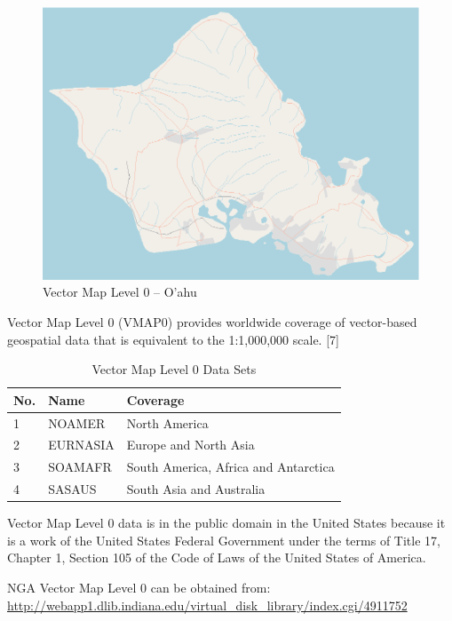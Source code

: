 \begin{figure}[h!]
  \centering
  \includegraphics[width=120mm]{eps/vmap0_oahu.eps}
  \caption{Vector Map Level 0 -- O'ahu}
\end{figure}

Vector Map Level 0 (VMAP0) provides worldwide coverage of vector-based geospatial data that is equivalent to the 1:1,000,000 scale. [7]

\begin{table}[h!]
  \begin{center}
    \begin{tabular}{ l | l | l }
      \toprule
      \textbf{No.} & \textbf{Name} & \textbf{Coverage} \\ \midrule
      1 & NOAMER   & North America \\
      2 & EURNASIA & Europe and North Asia \\
      3 & SOAMAFR  & South America, Africa and Antarctica \\
      4 & SASAUS   & South Asia and Australia \\
      \bottomrule
    \end{tabular}
    \caption{Vector Map Level 0 Data Sets}
  \end{center}
\end{table}

Vector Map Level 0 data is in the public domain in the United States because it is a work of the United States Federal Government under the terms of Title 17, Chapter 1, Section 105 of the Code of Laws of the United States of America.

NGA Vector Map Level 0 can be obtained from: \cite{Terrain-VMAP0} \\
\url{http://webapp1.dlib.indiana.edu/virtual_disk_library/index.cgi/4911752}

